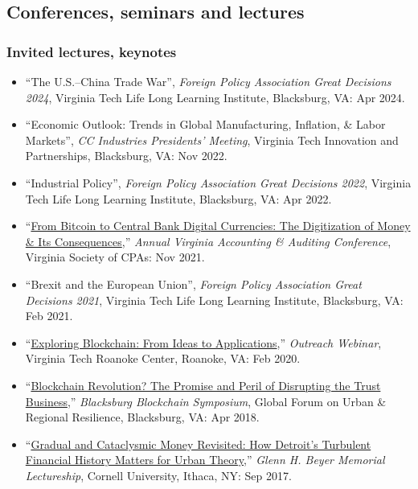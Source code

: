 \documentclass[letter,11pt]{article}
\begin{document}


\subsection*{Conferences, seminars and lectures}
\subsubsection*{Invited lectures, keynotes}
\begin{itemize}[--]
\itemsep0em
    \item \enquote{The U.S.--China Trade War}, \emph{Foreign Policy Association Great Decisions 2024}, Virginia Tech Life Long Learning Institute, Blacksburg, VA: Apr 2024.
    \item \enquote{Economic Outlook: Trends in Global Manufacturing, Inflation, \& Labor Markets}, \emph{CC Industries Presidents' Meeting}, Virginia Tech Innovation and Partnerships, Blacksburg, VA: Nov 2022.   
    \item \enquote{Industrial Policy}, \emph{Foreign Policy Association Great Decisions 2022}, Virginia Tech Life Long Learning Institute, Blacksburg, VA: Apr 2022.
    \item \enquote{\href{https://www.slideshare.net/davidbieri/from-bitcoin-to-central-bank-digital-currencies-the-digitization-of-money-its-consequences}{From Bitcoin to Central Bank Digital Currencies: The Digitization of Money \& Its Consequences},} \emph{Annual Virginia Accounting \& Auditing Conference}, Virginia Society of CPAs: Nov 2021.
    \item \enquote{Brexit and the European Union}, \emph{Foreign Policy Association Great Decisions 2021}, Virginia Tech Life Long Learning Institute, Blacksburg, VA: Feb 2021.
    \item \enquote{\href{https://www.slideshare.net/davidbieri/exploring-blockchain-from-ideas-to-applications}{Exploring Blockchain: From Ideas to Applications},} \emph{Outreach Webinar}, Virginia Tech Roanoke Center, Roanoke, VA: Feb 2020.
    \item \enquote{\href{https://www.researchgate.net/publication/326782744_Blockchain_Revolution_The_Promise_and_Peril_of_Disrupting_the_Trust_Business}{Blockchain Revolution? The Promise and Peril of Disrupting the Trust Business},} \emph{Blacksburg Blockchain Symposium}, Global Forum on Urban \& Regional Resilience, Blacksburg, VA: Apr 2018.
    \item \enquote{\href{https://aap.cornell.edu/news-events/david-bieri-gradual-and-cataclysmic-money-revisited-how-detroits-turbulent-financial}{Gradual and Cataclysmic Money Revisited: How Detroit's Turbulent Financial History Matters for Urban Theory},} \emph{Glenn H. Beyer Memorial Lectureship}, Cornell University, Ithaca, NY: Sep 2017.

\end{itemize}
\end{document}

